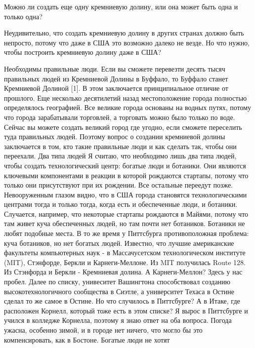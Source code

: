 \documentclass[ebook,12pt,oneside,openany]{memoir}
\begin{document}
\maketitle

Можно ли создать еще одну кремниевую долину, или она может быть одна и
только одна?

Неудивительно, что создать кремниевую долину в других странах должно
быть непросто, потому что даже в США это возможно далеко не везде. Но
что нужно, чтобы построить кремниевую долину даже в США?

Необходимы правильные люди. Если вы сможете перевезти десять тысяч
правильных людей из Кремниевой Долины в Буффало, то Буффало станет
Кремниевой Долиной [1]. В этом заключается принципиальное отличие от
прошлого. Еще несколько десятилетий назад местоположение города
полностью определялось географией. Все великие города основаны на
водных путях, потому что города зарабатывали торговлей, а торговать
можно было только по воде. Сейчас вы можете создать великий город где
угодно, если сможете переселить туда правильных людей. Поэтому вопрос
о создании кремниевой долины заключается в том, кто такие правильные
люди и как сделать так, чтобы они переехали. Два типа людей Я считаю,
что необходимо лишь два типа людей, чтобы создать технологический
центр: богатые люди и ботаники. Они являются ключевыми компонентами в
реакции в которой рождаются стартапы, потому что только они
присутствуют при их рождении. Все остальные переедут позже.
Невооруженным глазом видно, что в США города становятся
технологическими центрами тогда и только тогда, когда есть и
обеспеченные люди, и ботаники. Случается, например, что некоторые
стартапы рождаются в Майями, потому что там живет куча обеспеченных
людей, но там почти нет ботаников. Ботаники не любят подобные места. В
то же время у Питтсбурга противоположная проблема: куча ботаников, но
нет богатых людей. Известно, что лучшие американские факультеты
компьютерных наук - в Массачусетском технологическом институте (MIT),
Стэнфорде, Беркли и Карнеги-Меллоне. Из MIT получилась Route 128. Из
Стэнфорда и Беркли - Кремниевая долина. А Карнеги-Меллон? Здесь у нас
пробел. Далее по списку, унивеситет Вашингтона способствовал созданию
высокотехнологичного сообщества в Сиэтле, а университет Техаса в
Остине сделал то же самое в Остине. Но что случилось в Питтсбурге? А в
Итаке, где расположен Корнелл, который тоже есть в этом списке? Я
вырос в Питтсбурге и учился в колледже Корнелла, поэтому я знаю ответ
на оба вопроса. Погода ужасна, особенно зимой, и в городе нет ничего,
что могло бы это компенсировать, как в Бостоне. Богатые люди не хотят
\end{document}
